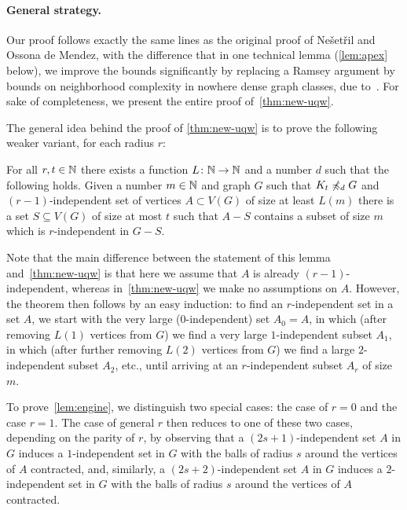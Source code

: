 \paragraph{General strategy.}
Our proof follows exactly the same lines as the original proof of Ne\v set\v ril and Ossona de Mendez, with the difference that in one technical lemma (\cref{lem:apex} below), we improve the bounds significantly by replacing a Ramsey argument by bounds on neighborhood
complexity in nowhere dense graph classes, due to~\cite{gajarsky2017kernelization}.
For sake of completeness, we present the entire proof of~\cref{thm:new-uqw}.


The general idea behind the proof of 
\cref{thm:new-uqw} is to prove the following 
weaker variant, for each radius $r$:

\begin{lemma}\label{lem:engine}
For all $r,t\in \mathbb{N}$ there exists a function $L\colon \mathbb{N}\to \mathbb{N}$
and a number $d$ such that the following holds.
Given a number $m\in \mathbb{N}$ and graph $G$ such that $K_t\not\preccurlyeq_d G$ and
$(r-1)$-independent set of vertices $A\subset V(G)$ of size at least $L(m)$ there is a set $S\subseteq V(G)$ of size at most $t$ such that $A-S$ contains a subset of size $m$ which is $r$-independent in $G-S$.
\end{lemma}

Note that the main difference between the statement of this lemma and~\cref{thm:new-uqw} is that here we assume that 
$A$ is already $(r-1)$-independent, whereas in~\cref{thm:new-uqw} we make no assumptions on $A$. However, the theorem then follows by an easy induction: to find an $r$-independent set in a set $A$, we start with 
the very large ($0$-independent) set $A_0=A$, in which (after removing 
$L(1)$ vertices from $G$)
we find a very large $1$-independent subset $A_1$, in which (after further removing $L(2)$ vertices from $G$) we find a large $2$-independent subset $A_2$, etc., until arriving at an $r$-independent subset $A_r$ of size $m$.

To prove~\cref{lem:engine}, we distinguish two special cases: the case of $r=0$ and the case $r=1$. The case of general $r$ then reduces to one of these two cases, depending on the parity of $r$, by observing that a $(2s+1)$-independent set $A$ in $G$
induces a $1$-independent set in $G$ with the balls of radius $s$ around the vertices of $A$ contracted, and,
similarly, a $(2s+2)$-independent set $A$ in $G$
induces a $2$-independent set in $G$ with the balls of radius $s$ around the vertices of $A$ contracted.

